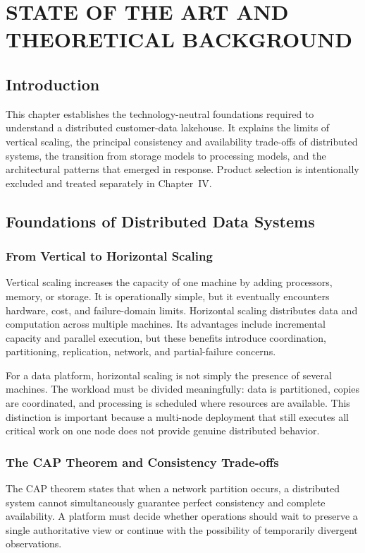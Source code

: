 \clearpage
\chapter{STATE OF THE ART AND THEORETICAL BACKGROUND}

\section{Introduction}
This chapter establishes the technology-neutral foundations required to understand a distributed customer-data lakehouse. It explains the limits of vertical scaling, the principal consistency and availability trade-offs of distributed systems, the transition from storage models to processing models, and the architectural patterns that emerged in response. Product selection is intentionally excluded and treated separately in Chapter~IV.

\section{Foundations of Distributed Data Systems}

\subsection{From Vertical to Horizontal Scaling}
Vertical scaling increases the capacity of one machine by adding processors, memory, or storage. It is operationally simple, but it eventually encounters hardware, cost, and failure-domain limits. Horizontal scaling distributes data and computation across multiple machines. Its advantages include incremental capacity and parallel execution, but these benefits introduce coordination, partitioning, replication, network, and partial-failure concerns.

For a data platform, horizontal scaling is not simply the presence of several machines. The workload must be divided meaningfully: data is partitioned, copies are coordinated, and processing is scheduled where resources are available. This distinction is important because a multi-node deployment that still executes all critical work on one node does not provide genuine distributed behavior.

\subsection{The CAP Theorem and Consistency Trade-offs}
The CAP theorem states that when a network partition occurs, a distributed system cannot simultaneously guarantee perfect consistency and complete availability. A platform must decide whether operations should wait to preserve a single authoritative view or continue with the possibility of temporarily divergent observations.

